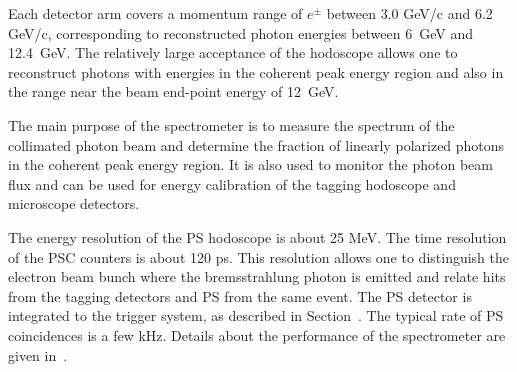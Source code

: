 Each detector arm covers a momentum range of $e^\pm$ between 3.0 GeV/c and 6.2 GeV/c, 
corresponding to reconstructed photon energies between 6~GeV and 12.4~GeV. The relatively
large acceptance of the hodoscope allows one to reconstruct photons
with energies in the coherent peak energy region and also in the range
near the beam end-point energy of 12~GeV.

The main purpose of the spectrometer is to measure the spectrum of the
collimated photon beam and determine the fraction of linearly polarized
photons in the coherent peak energy region.
It is also used to monitor the photon beam flux and can be used for 
energy calibration of the tagging hodoscope and microscope detectors.

The energy resolution of the PS hodoscope is about 25 MeV.
The time resolution of the PSC counters is about 120 ps. This resolution
allows one to distinguish the electron beam bunch where the bremsstrahlung photon is emitted and relate hits from the tagging detectors and PS
from the same event. The PS detector is integrated to the trigger system, as described in Section~\cite{sec:trig}. The typical rate of PS coincidences is
a few kHz. Details about the performance of the spectrometer are given in~\cite{Somov:2017vhp,Somov:2016bgb}.



